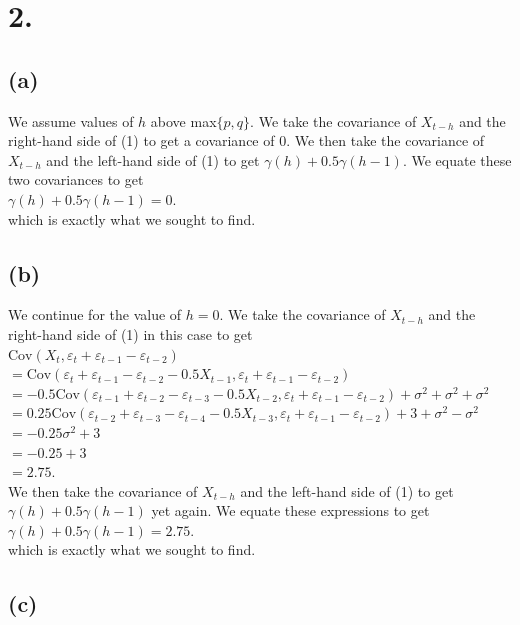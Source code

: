 \documentclass{article}
\begin{document}
\section*{2.}
{\Large 
\subsection*{(a)}

We assume values of $h$ above max$\{p, q\}$. We take the covariance of $X_{t-h}$ and the right-hand side of (1) to get a covariance of 0. We then take the covariance of $X_{t-h}$ and the left-hand side of (1) to get $\gamma(h) + 0.5\gamma(h-1)$. We equate these two covariances to get \\
$\gamma(h) + 0.5\gamma(h-1) = 0.$ \\
which is exactly what we sought to find.

\subsection*{(b)}

We continue for the value of $h=0$. We take the covariance of $X_{t-h}$ and the right-hand side of (1) in this case to get \\ $\text{Cov}(X_t, \varepsilon_t + \varepsilon_{t-1} - \varepsilon_{t-2})$ \\ 
$= \text{Cov}(\varepsilon_t + \varepsilon_{t-1} - \varepsilon_{t-2} - 0.5X_{t-1}, \varepsilon_t + \varepsilon_{t-1} - \varepsilon_{t-2})$ \\ 
$= -0.5\text{Cov}(\varepsilon_{t-1} + \varepsilon_{t-2} - \varepsilon_{t-3} - 0.5X_{t-2}, \varepsilon_t + \varepsilon_{t-1} - \varepsilon_{t-2}) + \sigma^2 + \sigma^2 + \sigma^2$ \\ 
$= 0.25\text{Cov}(\varepsilon_{t-2} + \varepsilon_{t-3} - \varepsilon_{t-4} - 0.5X_{t-3}, \varepsilon_t + \varepsilon_{t-1} - \varepsilon_{t-2}) + 3 + \sigma^2 - \sigma^2$ \\ 
$= -0.25\sigma^2 + 3$ \\ 
$= -0.25 + 3$ \\
$= 2.75$. \\
We then take the covariance of $X_{t-h}$ and the left-hand side of (1) to get $\gamma(h) + 0.5\gamma(h-1)$ yet again. We equate these expressions to get \\
$\gamma(h) + 0.5\gamma(h-1) = 2.75.$ \\
which is exactly what we sought to find.

\subsection*{(c)}

}
\end{document}
